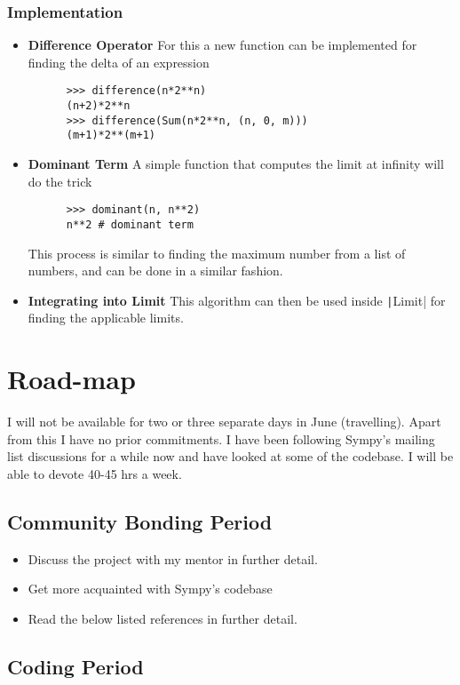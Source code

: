 \documentclass[a4paper,12pt]{article}
\newcommand{\pyline}[1]{\texttt|#1|}
\begin{document}
\subsubsection{Implementation}

\begin{itemize}
  \item \textbf{Difference Operator} For this a new function can be implemented for finding
    the delta of an expression
    \begin{verbatim}
      >>> difference(n*2**n)
      (n+2)*2**n
      >>> difference(Sum(n*2**n, (n, 0, m)))
      (m+1)*2**(m+1)
    \end{verbatim}
  \item \textbf{Dominant Term}
    A simple function that computes the limit at infinity will do the trick
    \begin{verbatim}
      >>> dominant(n, n**2)
      n**2 # dominant term
    \end{verbatim}
    This process is similar to finding the maximum number from a list of numbers, and can be done in a similar fashion.
  \item \textbf{Integrating into Limit}
    This algorithm can then be used inside \pyline{Limit} for finding the applicable limits.
\end{itemize}

\section{Road-map}
I will not be available for two or three separate days in June (travelling). Apart from this I have no prior commitments.
I have been following Sympy's mailing list discussions for a while now and have looked at some of the codebase.
I will be able to devote 40-45 hrs a week.

\subsection{Community Bonding Period}

\begin{itemize}
\item Discuss the project with my mentor in further detail.
\item Get more acquainted with Sympy's codebase
\item Read the below listed references in further detail.
\end{itemize}

\subsection{Coding Period}
\end{document}
